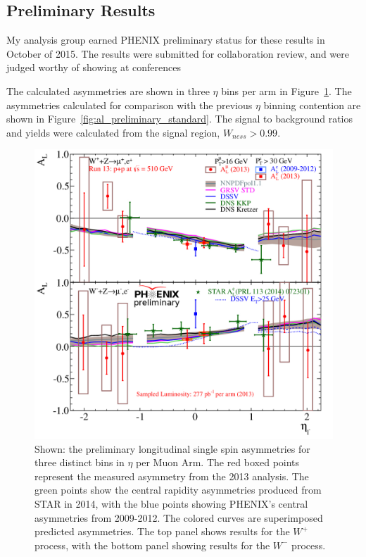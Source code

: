 \subsection{Preliminary Results}

My analysis group earned PHENIX preliminary status for these results in October
of 2015.  The results were submitted for collaboration review,
and were judged worthy of showing at conferences 

The calculated asymmetries are shown in three $\eta$ bins per arm in
Figure~\ref{fig:al_preliminary_three_eta}. The asymmetries calculated for
comparison with the previous $\eta$ binning contention are shown in
Figure~\ref{fig:al_preliminary_standard}. The signal to background ratios and
yields were calculated from the signal region, $W_{ness} > 0.99$. 

\begin{figure}[ht]
  \centering
  \includegraphics[width=0.8\linewidth]{./figures/prelim_AL_6bins.jpg}
  \caption{
    Shown: the preliminary longitudinal single spin asymmetries for three
    distinct bins in $\eta$ per Muon Arm. The red boxed points represent the
    measured asymmetry from the 2013 analysis. The green points show the central
    rapidity asymmetries produced from STAR in 2014, with the blue points
    showing PHENIX's central asymmetries from 2009-2012. The colored curves are
    superimposed predicted asymmetries. The top panel shows results for the
    $W^+$ process, with the bottom panel showing results for the $W^-$ process.
  }
  \label{fig:al_preliminary_three_eta}
\end{figure}

